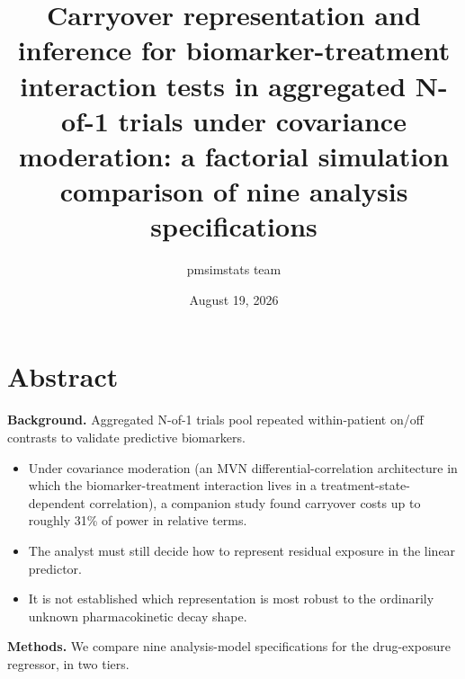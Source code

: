 \documentclass[
  11pt,
]{article}
\title{Carryover representation and inference for biomarker-treatment interaction tests in aggregated N-of-1 trials under covariance moderation: a factorial simulation comparison of nine analysis specifications}
\author{pmsimstats team}
\date{August 19, 2026}
\providecommand{\tightlist}{%
  \setlength{\itemsep}{0pt}\setlength{\parskip}{0pt}}
\begin{document}
\maketitle

{
\setcounter{tocdepth}{2}
\tableofcontents
}
\section*{Abstract}\label{abstract}

\textbf{Background.} Aggregated N-of-1 trials pool repeated within-patient
on/off contrasts to validate predictive biomarkers.

\begin{itemize}
\tightlist
\item
  Under covariance moderation (an MVN differential-correlation
  architecture in which the biomarker-treatment interaction lives in
  a treatment-state-dependent correlation), a companion study found
  carryover costs up to roughly 31\% of power in relative terms.
\item
  The analyst must still decide how to represent residual exposure in
  the linear predictor.
\item
  It is not established which representation is most robust to the
  ordinarily unknown pharmacokinetic decay shape.
\end{itemize}

\textbf{Methods.} We compare nine analysis-model specifications for the
drug-exposure regressor, in two tiers.
\end{document}
